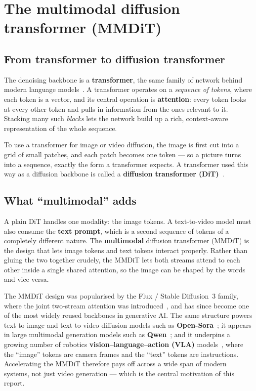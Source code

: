 \documentclass[11pt]{report}
\begin{document}
\section{The multimodal diffusion transformer (MMDiT)}
\label{sec:mmdit}

\subsection{From transformer to diffusion transformer}

The denoising backbone is a \textbf{transformer}, the same family of
network behind modern language models~\cite{vaswani2017attention}. A
transformer operates on a \emph{sequence of tokens}, where each token is a
vector, and its central operation is \textbf{attention}: every token looks
at every other token and pulls in information from the ones relevant to it.
Stacking many such \emph{blocks} lets the network build up a rich,
context-aware representation of the whole sequence.

To use a transformer for image or video diffusion, the image is first cut
into a grid of small patches, and each patch becomes one token --- so a
picture turns into a sequence, exactly the form a transformer expects.
A transformer used this way as a diffusion backbone is called a
\textbf{diffusion transformer (DiT)}~\cite{peebles2023dit}.

\subsection{What ``multimodal'' adds}

A plain DiT handles one modality: the image tokens. A text-to-video model
must also consume the \textbf{text prompt}, which is a second sequence of
tokens of a completely different nature. The \textbf{multimodal} diffusion
transformer (MMDiT) is the design that lets image tokens and text tokens
interact properly. Rather than gluing the two together crudely, the MMDiT
lets both streams attend to each other inside a single shared attention,
so the image can be shaped by the words and vice versa.

The MMDiT design was popularised by the Flux / Stable Diffusion~3 family,
where the joint two-stream attention was introduced~\cite{esser2024sd3},
and has since become one of the most widely reused backbones in generative
AI. The same structure powers text-to-image and text-to-video diffusion
models such as \textbf{Open-Sora}~\cite{opensora2024}; it appears in large
multimodal generation models such as \textbf{Qwen}~\cite{qwenimage2025};
and it underpins a growing number of robotics
\textbf{vision--language--action (VLA)} models~\cite{openvla2024}, where the
``image'' tokens are camera frames and the ``text'' tokens are
instructions. Accelerating
the MMDiT therefore pays off across a wide span of modern systems, not
just video generation --- which is the central motivation of this report.
\end{document}
